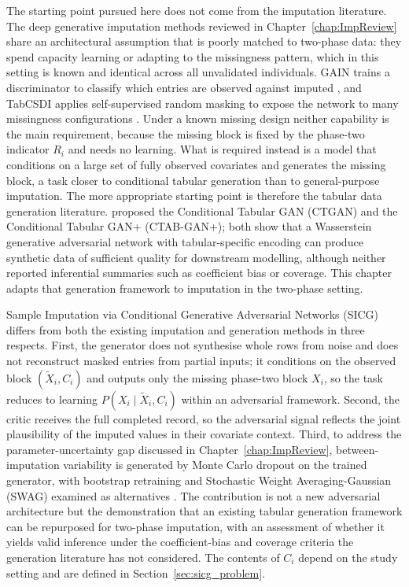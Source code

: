 The starting point pursued here does not come from the imputation literature. The deep generative imputation methods reviewed in Chapter~\ref{chap:ImpReview} share an architectural assumption that is poorly matched to two-phase data: they spend capacity learning or adapting to the missingness pattern, which in this setting is known and identical across all unvalidated individuals. GAIN trains a discriminator to classify which entries are observed against imputed \citep{yoon2018gain}, and TabCSDI applies self-supervised random masking to expose the network to many missingness configurations \citep{zheng2022diffusion}. Under a known missing design neither capability is the main requirement, because the missing block is fixed by the phase-two indicator $R_i$ and needs no learning. What is required instead is a model that conditions on a large set of fully observed covariates and generates the missing block, a task closer to conditional tabular generation than to general-purpose imputation. The more appropriate starting point is therefore the tabular data generation literature. \citet{xu2019modeling} proposed the Conditional Tabular GAN (CTGAN) and \citet{zhao2022ctabganplus} the Conditional Tabular GAN+ (CTAB-GAN+); both show that a Wasserstein generative adversarial network with tabular-specific encoding can produce synthetic data of sufficient quality for downstream modelling, although neither reported inferential summaries such as coefficient bias or coverage. This chapter adapts that generation framework to imputation in the two-phase setting.

Sample Imputation via Conditional Generative Adversarial Networks (SICG) differs from both the existing imputation and generation methods in three respects. First, the generator does not synthesise whole rows from noise and does not reconstruct masked entries from partial inputs; it conditions on the observed block $(\tilde{X}_i,C_i)$ and outputs only the missing phase-two block $X_i$, so the task reduces to learning $P(X_i\mid\tilde{X}_i,C_i)$ within an adversarial framework. Second, the critic receives the full completed record, so the adversarial signal reflects the joint plausibility of the imputed values in their covariate context. Third, to address the parameter-uncertainty gap discussed in Chapter~\ref{chap:ImpReview}, between-imputation variability is generated by Monte Carlo dropout on the trained generator, with bootstrap retraining and Stochastic Weight Averaging-Gaussian (SWAG) examined as alternatives \citep{gal2016dropout,maddox2019simple}. The contribution is not a new adversarial architecture but the demonstration that an existing tabular generation framework can be repurposed for two-phase imputation, with an assessment of whether it yields valid inference under the coefficient-bias and coverage criteria the generation literature has not considered. The contents of $C_i$ depend on the study setting and are defined in Section~\ref{sec:sicg_problem}.

